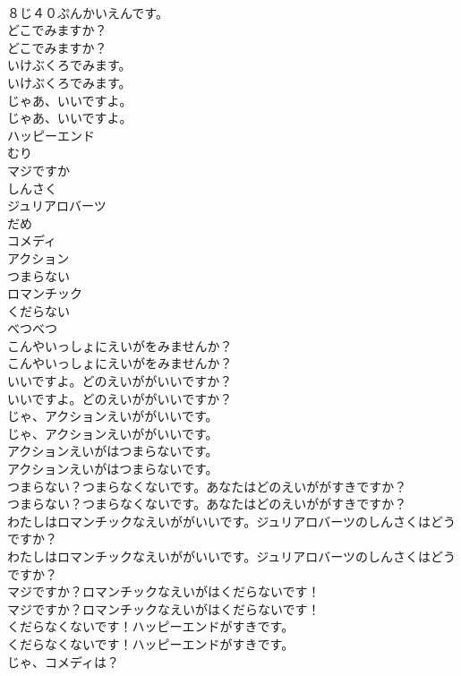 \documentclass[8pt]{extreport}
\begin{document}
\begin{CJK}{UTF8}{min}
\\	８じ４０ぷんかいえんです。 
\\	どこでみますか？	
\\	どこでみますか？ 
\\	いけぶくろでみます。	
\\	いけぶくろでみます。 
\\	じゃあ、いいですよ。	
\\	じゃあ、いいですよ。 
\\	ハッピーエンド
\\	むり
\\	マジですか
\\	しんさく
\\	ジュリアロバーツ
\\	だめ
\\	コメディ
\\	アクション
\\	つまらない
\\	ロマンチック
\\	くだらない
\\	べつべつ
\\	こんやいっしょにえいがをみませんか？	
\\	こんやいっしょにえいがをみませんか？ 
\\	いいですよ。どのえいががいいですか？	
\\	いいですよ。どのえいががいいですか？ 
\\	じゃ、アクションえいががいいです。	
\\	じゃ、アクションえいががいいです。 
\\	アクションえいがはつまらないです。	
\\	アクションえいがはつまらないです。 
\\	つまらない？つまらなくないです。あなたはどのえいががすきですか？	
\\	つまらない？つまらなくないです。あなたはどのえいががすきですか？ 
\\	わたしはロマンチックなえいががいいです。ジュリアロバーツのしんさくはどうですか？	
\\	わたしはロマンチックなえいががいいです。ジュリアロバーツのしんさくはどうですか？ 
\\	マジですか？ロマンチックなえいがはくだらないです！	
\\	マジですか？ロマンチックなえいがはくだらないです！ 
\\	くだらなくないです！ハッピーエンドがすきです。	
\\	くだらなくないです！ハッピーエンドがすきです。 
\\	じゃ、コメディは？	

\end{CJK}
\end{document}
